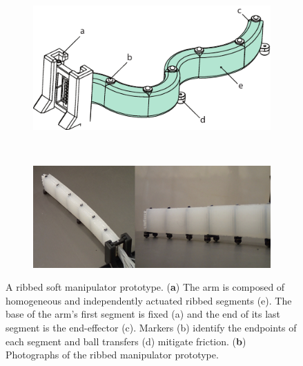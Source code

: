 \begin{figure}[htb]
        \centering
        \begin{subfigure}[b]{\columnwidth}
            \centering
            \includegraphics[width=0.9\columnwidth]{figures/manipulators/ribbed_manipulator}
            \caption{}
            \label{fig:ribbed_manipulator_design}
        \end{subfigure}\\
        \begin{subfigure}[b]{\columnwidth}
            \centering
            \includegraphics[width=0.9\columnwidth]{figures/manipulators/ribbed_manipulator_real}
            \caption{}
            \label{fig:ribbed_manipulator_real}
        \end{subfigure}%
        \caption[A ribbed soft manipulator prototype.]{A ribbed soft manipulator prototype. (\textbf{a}) The arm is composed of homogeneous and independently actuated ribbed segments (e). The base of the arm's first segment is fixed (a) and the end of its last segment is the end-effector (c). Markers (b) identify the endpoints of each segment and ball transfers (d) mitigate friction. (\textbf{b}) Photographs of the ribbed manipulator prototype.}
\end{figure}

